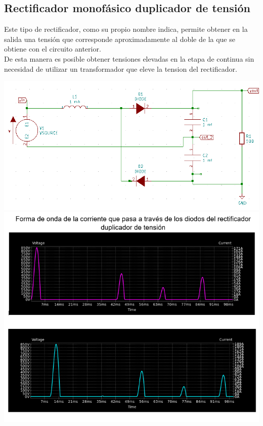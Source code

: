 \documentclass[12pt,a4paper]{article}
\begin{document}
\subsection{Rectificador monofásico duplicador de tensión}
\begin{flushleft}
Este tipo de rectificador, como su propio nombre indica, permite obtener en la salida una tensión que corresponde aproximadamente al doble de la que se obtiene con el circuito anterior.\\
De esta manera es posible obtener tensiones elevadas en la etapa de continua sin necesidad de utilizar un transformador que eleve la tension del rectificador.\\
\end{flushleft}
\begin{center}
\includegraphics[scale=0.8]{imagenes/p4/Circuito4.png} 
\\
\includegraphics[scale=0.8]{imagenes/p4/dio/diodofinal.PNG} 
\end{center}
\end{document}
